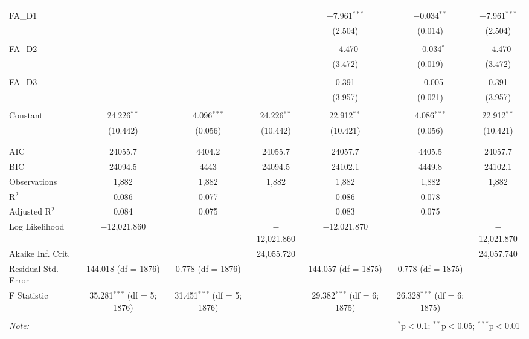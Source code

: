 \begin{table}[!htbp]
{\begin{tabular}{@{\extracolsep{5pt}}lcccccc}
  & & & & & & \\ 
 FA\_D1 &  &  &  & $-$7.961$^{***}$ & $-$0.034$^{**}$ & $-$7.961$^{***}$ \\ 
  &  &  &  & (2.504) & (0.014) & (2.504) \\ 
  & & & & & & \\ 
 FA\_D2 &  &  &  & $-$4.470 & $-$0.034$^{*}$ & $-$4.470 \\ 
  &  &  &  & (3.472) & (0.019) & (3.472) \\ 
  & & & & & & \\ 
 FA\_D3 &  &  &  & 0.391 & $-$0.005 & 0.391 \\ 
  &  &  &  & (3.957) & (0.021) & (3.957) \\ 
  & & & & & & \\ 
 Constant & 24.226$^{**}$ & 4.096$^{***}$ & 24.226$^{**}$ & 22.912$^{**}$ & 4.086$^{***}$ & 22.912$^{**}$ \\ 
  & (10.442) & (0.056) & (10.442) & (10.421) & (0.056) & (10.421) \\ 
  & & & & & & \\ 
\hline \\[-1.8ex] 
AIC & 24055.7 & 4404.2 & 24055.7 & 24057.7 & 4405.5 & 24057.7 \\ 
BIC & 24094.5 & 4443 & 24094.5 & 24102.1 & 4449.8 & 24102.1 \\ 
Observations & 1,882 & 1,882 & 1,882 & 1,882 & 1,882 & 1,882 \\ 
R$^{2}$ & 0.086 & 0.077 &  & 0.086 & 0.078 &  \\ 
Adjusted R$^{2}$ & 0.084 & 0.075 &  & 0.083 & 0.075 &  \\ 
Log Likelihood & $-$12,021.860 &  & $-$12,021.860 & $-$12,021.870 &  & $-$12,021.870 \\ 
Akaike Inf. Crit. &  &  & 24,055.720 &  &  & 24,057.740 \\ 
Residual Std. Error & 144.018 (df = 1876) & 0.778 (df = 1876) &  & 144.057 (df = 1875) & 0.778 (df = 1875) &  \\ 
F Statistic & 35.281$^{***}$ (df = 5; 1876) & 31.451$^{***}$ (df = 5; 1876) &  & 29.382$^{***}$ (df = 6; 1875) & 26.328$^{***}$ (df = 6; 1875) &  \\ 
\hline 
\hline \\[-1.8ex] 
\textit{Note:}  & \multicolumn{6}{r}{$^{*}$p$<$0.1; $^{**}$p$<$0.05; $^{***}$p$<$0.01} \\ 
\end{tabular}}
\end{table} 
